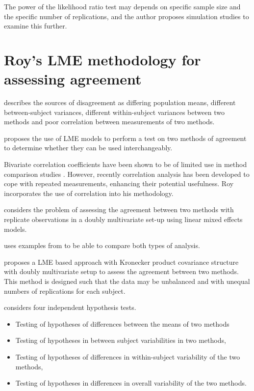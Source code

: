 \documentclass[12pt, a4paper]{article}
\theoremstyle{plain}
\theoremstyle{definition}
\theoremstyle{remark}
\begin{document}
 The power of the
likelihood ratio test may depends on specific sample size and the
specific number of  replications, and the author proposes
simulation studies to examine this further.

\section{Roy's LME methodology for assessing agreement}

\citet{Barnhart}  describes the sources of disagreement as
differing population means, different between-subject variances,
different within-subject variances between two methods and poor
correlation between measurements of two methods.


\citet{ARoy2009}proposes the use of LME models to perform a test
on two methods of agreement to determine whether they can be used
interchangeably.

Bivariate correlation coefficients have been shown to be of
limited use in method comparison studies \citep{BA86}. However,
recently correlation analysis has been developed to cope with
repeated measurements, enhancing their potential usefulness. Roy
incorporates the use of correlation into his methodology.


\citet{ARoy2009} considers the problem of assessing the agreement
between two methods with replicate observations in a doubly
multivariate set-up using linear mixed effects models.


\citet{ARoy2009} uses examples from \citet{BA86} to be able to
compare both types of analysis.

\citet{ARoy2009} proposes a LME based approach with Kronecker
product covariance structure with doubly multivariate setup to
assess the agreement between two methods. This method is designed
such that the data may be unbalanced and with unequal numbers of
replications for each subject.

\citet{ARoy2009} considers four independent hypothesis tests.
\begin{itemize}
\item Testing of hypotheses of differences between the means of
two methods\item Testing of hypotheses in between subject
variabilities in two methods, \item Testing of hypotheses of
differences in within-subject variability of the two methods,
\item Testing of hypotheses in differences in overall variability
of the two methods.
\end{itemize}
\end{document}
